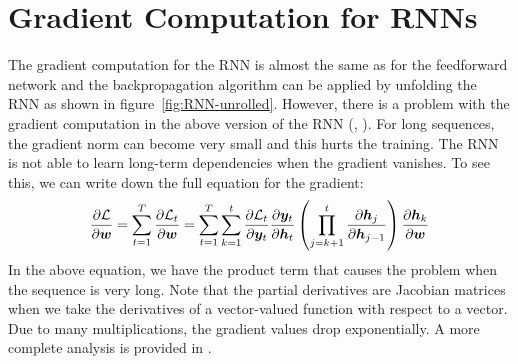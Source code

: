 	\section{Gradient Computation for RNNs}\label{sec:gradient_computation_RNN}
		The gradient computation for the RNN is almost the same as for the feedforward network and the backpropagation algorithm can be applied by unfolding the RNN as shown in figure~\ref{fig:RNN-unrolled}.
		However, there is a problem with the gradient computation in the above version of the RNN (\cite{pascanu2013difficulty}, \cite{bengio1994learning}).
		For long sequences, the gradient norm can become very small and this hurts the training.
		The RNN is not able to learn long-term dependencies when the gradient vanishes.
		To see this, we can write down the full equation for the gradient:
		\begin{equation}\label{eq:gradient_computation_RNN}
			\frac{\partial \mathcal{L}}{\partial \bm{w}}
			= \sum_{t=1}^{T} 
				\frac{\partial \mathcal{L}_t}{\partial \bm{w}}
			= \sum_{t=1}^{T} 
				\sum_{k=1}^{t} 
					\frac{\partial \mathcal{L}_t}{\partial \bm{y}_t}
					\frac{\partial \bm{y}_t}{\partial \bm{h}_t}
					\left(
						\prod_{j=k+1}^{t} \frac{\partial \bm{h}_j}{\partial \bm{h}_{j-1}}
					\right)
					\frac{\partial \bm{h}_{k}}{\partial \bm{w}}
		\end{equation}
		In the above equation, we have the product term that causes the problem when the sequence is very long.
		Note that the partial derivatives are Jacobian matrices when we take the derivatives of a vector-valued function with respect to a vector.
		Due to many multiplications, the gradient values drop exponentially.
		A more complete analysis is provided in \cite{pascanu2013difficulty}.
		
